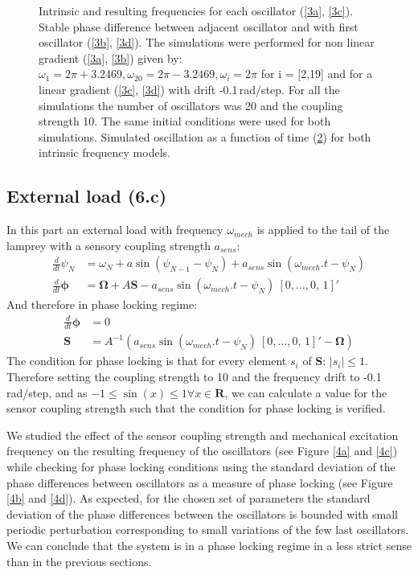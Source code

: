 \documentclass[a4paper]{scrartcl}
\begin{document}
\begin{figure}[!b]
\begin{subfigure}[b]{\textwidth}
		\caption{}\label{3e}
	\end{subfigure}
	\caption{Intrinsic and resulting frequencies for each oscillator (\ref{3a}, \ref{3c}). Stable phase difference between adjacent oscillator and with first oscillator (\ref{3b}, \ref{3d}). The simulations were performed for non linear gradient (\ref{3a}, \ref{3b}) given by: $\omega_{1} = 2\pi + 3.2469 ,\omega_{20} = 2\pi - 3.2469 , \omega_{i} = 2\pi$ for i = [2,19] and for a linear gradient (\ref{3c}, \ref{3d}) with drift -0.1\,rad/step. For all the simulations the number of oscillators was 20 and the coupling strength 10. The same initial conditions were used for both simulations. Simulated oscillation as a function of time (\ref{3e}) for both intrinsic frequency models.}
\end{figure}


\subsection{External load (6.c)}
In this part an external load with frequency $\omega_{mech}$ is applied to the tail of the lamprey with a sensory coupling strength $a_{sens}$:
\begin{align*}
\frac{d}{dt}\psi_N &= \omega_N + a \sin(\psi_{N-1}-\psi_N) + a_{sens} \sin(\omega_{mech}.t-\psi_N) \\
\frac{d}{dt}\mathbf{\phi} &= \mathbf{\Omega} + A \mathbf{S} - a_{sens} \sin(\omega_{mech}.t-\psi_N)\ [0, \ldots, 0,\, 1]'
\end{align*}
And therefore in phase locking regime:
\begin{align*}
\frac{d}{dt}\mathbf{\phi} &= 0\\
\mathbf{S} &= A^{-1}(a_{sens}\sin(\omega_{mech}.t-\psi_N)\ [0, \ldots, 0,\, 1]'-\mathbf{\Omega})
\end{align*}
The condition for phase locking is that for every element $s_i$ of $\mathbf{S}$: $|s_i|\leq1$.
Therefore setting the coupling strength to 10 and the frequency drift to -0.1\,rad/step, and as $-1\leq\sin(x)\leq1 \forall x \in \mathbf{R}$, we can calculate a value for the sensor coupling strength such that the condition for phase locking is verified.

We studied the effect of the sensor coupling strength and mechanical excitation frequency on the resulting frequency of the oscillators (see Figure \ref{4a} and \ref{4c}) while checking for phase locking conditions using the standard deviation of the phase differences between oscillators as a measure of phase locking (see Figure \ref{4b} and \ref{4d}). As expected, for the chosen set of parameters the standard deviation of the phase differences between the oscillators is bounded with small periodic perturbation corresponding to small variations of the few last oscillators. We can conclude that the system is in a phase locking regime in a less strict sense than in the previous sections.
\end{document}
